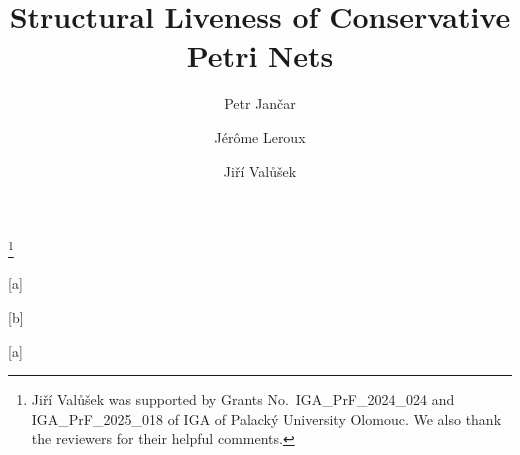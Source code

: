 \documentclass{lmcs} %
\def\eg{{\em e.g.}}
\begin{document}
\title{Structural Liveness of Conservative Petri Nets}
\thanks{Ji\v{r}\'{i} Val\r{u}\v{s}ek was supported by
Grants No.\ IGA\_PrF\_2024\_024 and IGA\_PrF\_2025\_018 of IGA of Palack\'y University Olomouc.
We also thank the reviewers for their helpful comments.}	%
\author[P.~Jan\v{c}ar]{Petr Jan\v{c}ar}[a]
\author[J.~Leroux]{J{\'{e}}r{\^{o}}me Leroux}[b]
\author[J.~Val\r{u}\v{s}ek]{Ji\v{r}{\'{i}} Val\r{u}\v{s}ek}[a]

\address{Dept of Comp. Sci., Faculty of Science, Palack\'y
University, Olomouc, Czechia}	%

\address{LaBRI, CNRS, Univ. Bordeaux, France}	%




\end{document}
